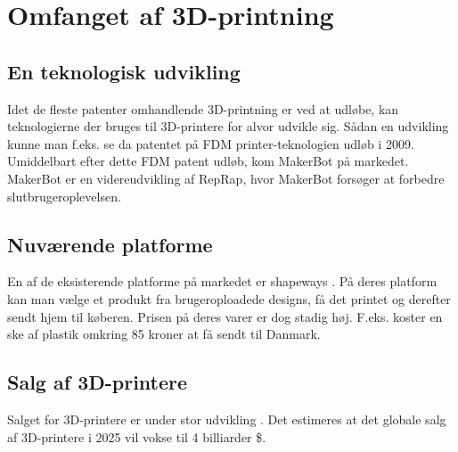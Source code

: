 \section{Omfanget af 3D-printning} %

\subsection{En teknologisk udvikling} %

Idet de fleste patenter omhandlende 3D-printning er ved at udløbe, kan teknologierne der bruges til 3D-printere for alvor udvikle sig. Sådan en udvikling kunne man f.eks. se da patentet på FDM printer-teknologien udløb i 2009. \autocite{manyika_disruptive_2013} Umiddelbart efter dette FDM patent udløb, kom MakerBot på markedet. MakerBot er en videreudvikling af RepRap, hvor MakerBot forsøger at forbedre slutbrugeroplevelsen. \autocite{_makerbot_2013}


\subsection{Nuværende platforme} %

En af de eksisterende platforme på markedet er shapeways \autocite{_shapeways_????}. På deres platform kan man vælge et produkt fra brugeroploadede designs, få det printet og derefter sendt hjem til køberen. Prisen på deres varer er dog stadig høj. F.eks. koster en ske af plastik omkring 85 kroner at få sendt til Danmark. \autocite{_magic_????}

\subsection{Salg af 3D-printere}

Salget for 3D-printere er under stor udvikling \autocite{wohler_sales_2012}. Det estimeres at det globale salg af 3D-printere i 2025 vil vokse til 4 billiarder \$. \autocite[110]{manyika_disruptive_2013}




